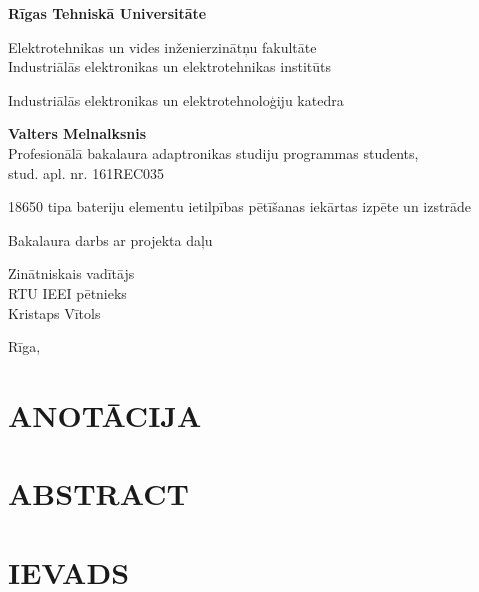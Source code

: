 \documentclass[12pt,fleqn,titlepage,oneside]{article}
\numberwithin{equation}{section}
\numberwithin{figure}{section}
\numberwithin{table}{section}
\newcommand{\authorName}{Valters Melnalksnis}
\newcommand{\authorId}{161REC035}
\begin{document}
\begin{titlepage}
	\centering
	\doublespacing
	{\Large \textbf{Rīgas Tehniskā Universitāte}}
	
	{Elektrotehnikas un vides inženierzinātņu fakultāte\\}
	{Industriālās elektronikas un elektrotehnikas institūts\\}
	{Industriālās elektronikas un elektrotehnoloģiju katedra\par}
	\vspace{2cm}
	
	\onehalfspacing
	{\Large \textbf{\authorName}\\}
	Profesionālā bakalaura adaptronikas studiju programmas students,\\
	stud. apl. nr. \authorId
	\vspace{2cm}
	
	{\huge 18650 tipa bateriju elementu ietilpības pētīšanas iekārtas izpēte un izstrāde\par}
	
	\doublespacing
	{\Large Bakalaura darbs ar projekta daļu\par}
	\onehalfspacing
	\vspace{6cm}
	
	\raggedleft
	Zinātniskais vadītājs\\
	RTU IEEI pētnieks\\
	Kristaps Vītols
	
	\centering
	\vfill
	Rīga, \the\year
\end{titlepage}

\onehalfspacing
\FloatBarrier
\newpage
\setcounter{page}{2}
\section*{\MakeUppercase{Anotācija}}

\newpage

\section*{\MakeUppercase{Abstract}}

\newpage

\doublespacing
\tableofcontents
\onehalfspacing
\newpage

\section*{\texorpdfstring{\MakeUppercase{Ievads}}{Ievads}}
\end{document}
